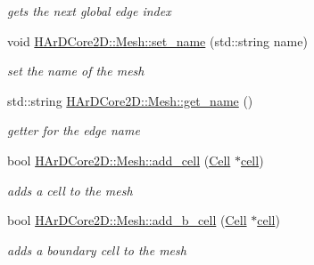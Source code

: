 \begin{DoxyCompactItemize}
\begin{DoxyCompactList}\small\item\em gets the next global edge index \end{DoxyCompactList}\item 
\mbox{\label{group__Mesh_ga6ac77eb1c0d7ed0ccd8567ca03321531}} 
void \hyperlink{group__Mesh_ga6ac77eb1c0d7ed0ccd8567ca03321531}{H\+Ar\+D\+Core2\+D\+::\+Mesh\+::set\+\_\+name} (std\+::string name)
\begin{DoxyCompactList}\small\item\em set the name of the mesh \end{DoxyCompactList}\item 
\mbox{\label{group__Mesh_ga084bd89b4d3767370cbb2da9ffd8ac87}} 
std\+::string \hyperlink{group__Mesh_ga084bd89b4d3767370cbb2da9ffd8ac87}{H\+Ar\+D\+Core2\+D\+::\+Mesh\+::get\+\_\+name} ()
\begin{DoxyCompactList}\small\item\em getter for the edge name \end{DoxyCompactList}\item 
\mbox{\label{group__Mesh_ga59082af6b1da515cdb99c4daacf5e2fd}} 
bool \hyperlink{group__Mesh_ga59082af6b1da515cdb99c4daacf5e2fd}{H\+Ar\+D\+Core2\+D\+::\+Mesh\+::add\+\_\+cell} (\hyperlink{classHArDCore2D_1_1Cell}{Cell} $\ast$\hyperlink{classHArDCore2D_1_1Mesh_ae07b938c57cf57e3bb9c76d3df1eb549}{cell})
\begin{DoxyCompactList}\small\item\em adds a cell to the mesh \end{DoxyCompactList}\item 
\mbox{\label{group__Mesh_ga440c6f4a38af3d6c48d25fa416f24366}} 
bool \hyperlink{group__Mesh_ga440c6f4a38af3d6c48d25fa416f24366}{H\+Ar\+D\+Core2\+D\+::\+Mesh\+::add\+\_\+b\+\_\+cell} (\hyperlink{classHArDCore2D_1_1Cell}{Cell} $\ast$\hyperlink{classHArDCore2D_1_1Mesh_ae07b938c57cf57e3bb9c76d3df1eb549}{cell})
\begin{DoxyCompactList}\small\item\em adds a boundary cell to the mesh \end{DoxyCompactList}\item 
\mbox{\label{group__Mesh_ga3a47d6ebfdb4254c57b7b672b51a992b}} 

\end{DoxyCompactItemize}
